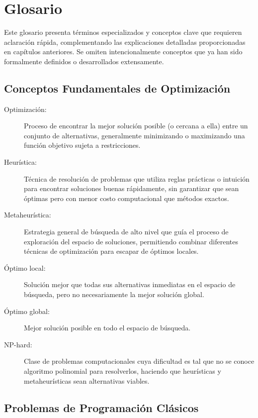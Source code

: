 \chapter{Glosario}

Este glosario presenta términos especializados y conceptos clave que requieren aclaración rápida, complementando las explicaciones detalladas proporcionadas en capítulos anteriores. Se omiten intencionalmente conceptos que ya han sido formalmente definidos o desarrollados extensamente.

\section*{Conceptos Fundamentales de Optimización}

\begin{description}
    \item[Optimización:] Proceso de encontrar la mejor solución posible (o cercana a ella) entre un conjunto de alternativas, generalmente minimizando o maximizando una función objetivo sujeta a restricciones.
    
    \item[Heurística:] Técnica de resolución de problemas que utiliza reglas prácticas o intuición para encontrar soluciones buenas rápidamente, sin garantizar que sean óptimas pero con menor costo computacional que métodos exactos.
    
    \item[Metaheurística:] Estrategia general de búsqueda de alto nivel que guía el proceso de exploración del espacio de soluciones, permitiendo combinar diferentes técnicas de optimización para escapar de óptimos locales.
    
    \item[Óptimo local:] Solución mejor que todas sus alternativas inmediatas en el espacio de búsqueda, pero no necesariamente la mejor solución global.
    
    \item[Óptimo global:] Mejor solución posible en todo el espacio de búsqueda.
    
    \item[NP-hard:] Clase de problemas computacionales cuya dificultad es tal que no se conoce algoritmo polinomial para resolverlos, haciendo que heurísticas y metaheurísticas sean alternativas viables.
\end{description}

\section*{Problemas de Programación Clásicos}

